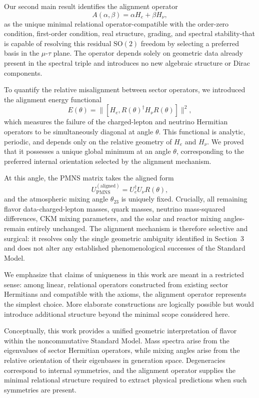 Our second main result identifies the alignment operator
\[
A(\alpha,\beta)=\alpha H_e + \beta H_\nu,
\]
as the unique minimal relational operator-compatible with the order-zero condition, first-order condition, real structure, grading, and spectral stability-that is capable of resolving this residual $\mathrm{SO}(2)$ freedom by selecting a preferred basis in the $\mu$-$\tau$ plane. The operator depends solely on geometric data already present in the spectral triple and introduces no new algebraic structure or Dirac components.

To quantify the relative misalignment between sector operators, we introduced the alignment energy functional
\[
E(\theta)
= \big\| [H_e, R(\theta)^\dagger H_\nu R(\theta)] \big\|^2,
\]
which measures the failure of the charged-lepton and neutrino Hermitian operators to be simultaneously diagonal at angle $\theta$. This functional is analytic, periodic, and depends only on the relative geometry of $H_e$ and $H_\nu$. We proved that it possesses a unique global minimum at an angle $\theta$, corresponding to the preferred internal orientation selected by the alignment mechanism.

At this angle, the PMNS matrix takes the aligned form
\[
U_{\mathrm{PMNS}}^{(\mathrm{aligned})}
= U_e^\dagger U_\nu R(\theta),
\]
and the atmospheric mixing angle $\theta_{23}$ is uniquely fixed.
Crucially, all remaining flavor data-charged-lepton masses, quark masses, neutrino mass-squared differences, CKM mixing parameters, and the solar and reactor mixing angles-remain entirely unchanged. The alignment mechanism is therefore selective and surgical: it resolves only the single geometric ambiguity identified in Section~3 and does not alter any established phenomenological successes of the Standard Model.

We emphasize that claims of uniqueness in this work are meant in a restricted sense: among linear, relational operators constructed from existing sector Hermitians and compatible with the axioms, the alignment operator represents the simplest choice. More elaborate constructions are logically possible but would introduce additional structure beyond the minimal scope considered here.

Conceptually, this work provides a unified geometric interpretation of flavor within the noncommutative Standard Model. Mass spectra arise from the eigenvalues of sector Hermitian operators, while mixing angles arise from the relative orientation of their eigenbases in generation space. Degeneracies correspond to internal symmetries, and the alignment operator supplies the minimal relational structure required to extract physical predictions when such symmetries are present.

